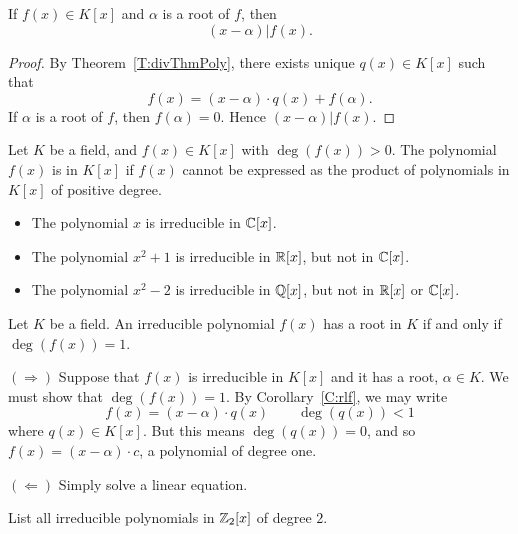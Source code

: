 \documentclass{ximera}
\begin{document}
\begin{corollary}\label{C:rlf}
  If $f(x)\in K[x]$ and $\alpha$ is a root of $f$, then
  \[
  (x-\alpha) | f(x).
  \]
  \begin{proof}
  By Theorem~\ref{T:divThmPoly}, there exists unique $q(x)\in K[x]$
  such that
  \[
  f(x) = (x-\alpha)\cdot q(x) + f(\alpha).
  \]
  If $\alpha$ is a root of $f$, then $f(\alpha) = 0$. Hence
  $(x-\alpha) | f(x)$.
  \end{proof}
\end{corollary}



\begin{definition}
  Let $K$ be a field, and $f(x)\in K[x]$ with $\deg(f(x))>0$. The
  polynomial $f(x)$ is  in $K[x]$ if $f(x)$ cannot be
  expressed as the product of polynomials in $K[x]$ of positive
  degree.
\end{definition}

\begin{example}\hfil
  \begin{itemize}
  \item The polynomial $x$ is irreducible in $\mathbb C[x]$.
  \item The polynomial $x^2+1$ is irreducible in $\mathbb R[x]$, but not in
    $\mathbb C[x]$.
  \item The polynomial $x^2-2$ is irreducible in $\mathbb Q[x]$, but not in
    $\mathbb R[x]$ or $\mathbb C[x]$.
  \end{itemize}
\end{example}

\begin{corollary}
  Let $K$ be a field. An irreducible polynomial $f(x)$ has a root in
  $K$ if and only if $\deg(f(x))= 1$.
  \begin{sketch}
    $(\Rightarrow)$ Suppose that $f(x)$ is irreducible in $K[x]$ and
    it has a root, $\alpha\in K$. We must show that $\deg(f(x))=
    1$. By Corollary~\ref{C:rlf}, we may write
    \[
    f(x) = (x-\alpha)\cdot q(x)\qquad\deg(q(x))< 1
    \]
    where $q(x)\in K[x]$. But this means $\deg(q(x)) = 0$, and so
    $f(x) = (x-\alpha)\cdot c$, a polynomial of degree one.


    $(\Leftarrow)$ Simply solve a linear equation.
  \end{sketch}
\end{corollary}

\begin{exercise}
  List all irreducible polynomials in $\mathbb Z_2[x]$ of degree $2$.
\end{exercise}
\end{document}
